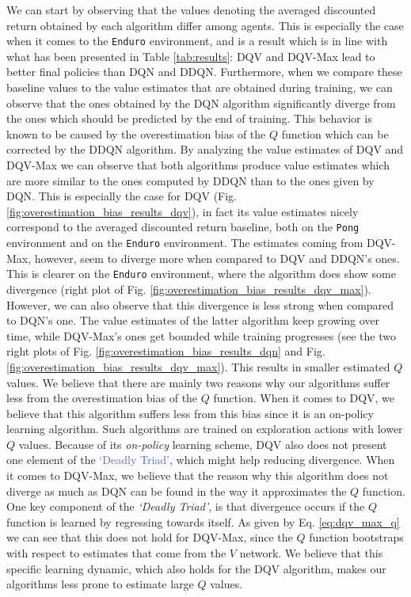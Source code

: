 We can start by observing that the values denoting the averaged discounted return obtained by each algorithm differ among agents. This is especially the case when it comes to the \texttt{Enduro} environment, and is a result which is in line with what has been presented in Table \ref{tab:results}: DQV and DQV-Max lead to better final policies than DQN and DDQN. Furthermore, when we compare these baseline values to the value estimates that are obtained during training, we can observe that the ones obtained by the DQN algorithm significantly diverge from the ones which should be predicted by the end of training. This behavior is known to be caused by the overestimation bias of the $Q$ function which can be corrected by the DDQN algorithm. By analyzing the value estimates of DQV and DQV-Max we can observe that both algorithms produce value estimates which are more similar to the ones computed by DDQN than to the ones given by DQN. This is especially the case for DQV (Fig. \ref{fig:overestimation_bias_results_dqv}), in fact its value estimates nicely correspond to the averaged discounted return baseline, both on the \texttt{Pong} environment and on the \texttt{Enduro} environment. The estimates coming from DQV-Max, however, seem to diverge more when compared to DQV and DDQN's ones. This is clearer on the \texttt{Enduro} environment, where the algorithm does show some divergence (right plot of Fig. \ref{fig:overestimation_bias_results_dqv_max}). However, we can also observe that this divergence is less strong when compared to DQN's one. The value estimates of the latter algorithm keep growing over time, while DQV-Max's ones get bounded while training progresses (see the two right plots of Fig. \ref{fig:overestimation_bias_results_dqn} and Fig. \ref{fig:overestimation_bias_results_dqv_max}). This results in smaller estimated $Q$ values. We believe that there are mainly two reasons why our algorithms suffer less from the overestimation bias of the $Q$ function. When it comes to DQV, we believe that this algorithm suffers less from this bias since it is an on-policy learning algorithm. Such algorithms are trained on exploration actions with lower $Q$ values. Because of its \textit{on-policy} learning scheme, DQV also does not present one element of the \textcolor{RoyalBlue}{`Deadly Triad'}, which might help reducing divergence. When it comes to DQV-Max, we believe that the reason why this algorithm does not diverge as much as DQN can be found in the way it approximates the $Q$ function. One key component of the \textit{`Deadly Triad'}, is that divergence occurs if the $Q$ function is learned by regressing towards itself. As given by Eq. \ref{eq:dqv_max_q} we can see that this does not hold for DQV-Max, since the $Q$ function bootstraps with respect to estimates that come from the $V$ network. We believe that this specific learning dynamic, which also holds for the DQV algorithm, makes our algorithms less prone to estimate large $Q$ values.

